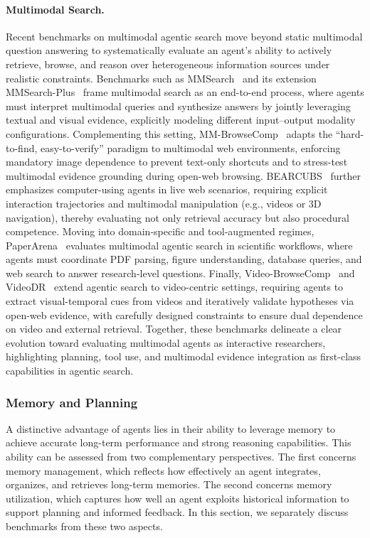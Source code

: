 \paragraph{Multimodal Search.} Recent benchmarks on multimodal agentic search move beyond static multimodal question answering to systematically evaluate an agent’s ability to actively retrieve, browse, and reason over heterogeneous information sources under realistic constraints. Benchmarks such as MMSearch~\cite{jiang2024mmsearch} and its extension MMSearch-Plus~\cite{tao2025mmsearch} frame multimodal search as an end-to-end process, where agents must interpret multimodal queries and synthesize answers by jointly leveraging textual and visual evidence, explicitly modeling different input–output modality configurations. Complementing this setting, MM-BrowseComp~\cite{li2025mm} adapts the “hard-to-find, easy-to-verify” paradigm to multimodal web environments, enforcing mandatory image dependence to prevent text-only shortcuts and to stress-test multimodal evidence grounding during open-web browsing. BEARCUBS~\cite{song2025bearcubs} further emphasizes computer-using agents in live web scenarios, requiring explicit interaction trajectories and multimodal manipulation (e.g., videos or 3D navigation), thereby evaluating not only retrieval accuracy but also procedural competence. Moving into domain-specific and tool-augmented regimes, PaperArena~\cite{wang2025paperarena} evaluates multimodal agentic search in scientific workflows, where agents must coordinate PDF parsing, figure understanding, database queries, and web search to answer research-level questions. Finally, Video-BrowseComp~\cite{liang2025video} and VideoDR~\cite{liu2026videodr} extend agentic search to video-centric settings, requiring agents to extract visual-temporal cues from videos and iteratively validate hypotheses via open-web evidence, with carefully designed constraints to ensure dual dependence on video and external retrieval. Together, these benchmarks delineate a clear evolution toward evaluating multimodal agents as interactive researchers, highlighting planning, tool use, and multimodal evidence integration as first-class capabilities in agentic search.


\subsubsection{Memory and Planning}

A distinctive advantage of agents lies in their ability to leverage memory to achieve accurate long-term performance and strong reasoning capabilities. This ability can be assessed from two complementary perspectives. The first concerns memory management, which reflects how effectively an agent integrates, organizes, and retrieves long-term memories. The second concerns memory utilization, which captures how well an agent exploits historical information to support planning and informed feedback. In this section, we separately discuss benchmarks from these two aspects.

